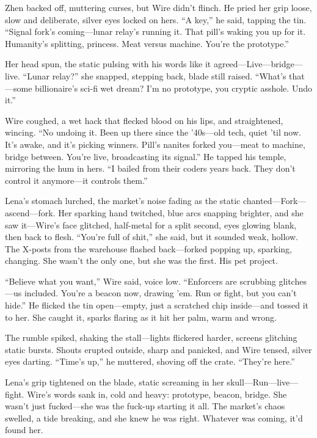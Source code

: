 \documentclass[12pt]{book}
\begin{document}
Zhen backed off, muttering curses, but Wire didn’t flinch. He pried her grip loose, slow and deliberate, silver eyes locked on hers. ``A key,'' he said, tapping the tin. ``Signal fork's coming---lunar relay's running it. That pill's waking you up for it. Humanity's splitting, princess. Meat versus machine. You're the prototype.''

Her head spun, the static pulsing with his words like it agreed---Live---bridge---live. ``Lunar relay?'' she snapped, stepping back, blade still raised. ``What's that---some billionaire's sci-fi wet dream? I'm no prototype, you cryptic asshole. Undo it.''

Wire coughed, a wet hack that flecked blood on his lips, and straightened, wincing. ``No undoing it. Been up there since the '40s---old tech, quiet 'til now. It's awake, and it's picking winners. Pill's nanites forked you---meat to machine, bridge between. You're live, broadcasting its signal.'' He tapped his temple, mirroring the hum in hers. ``I bailed from their coders years back. They don't control it anymore---it controls them.''

Lena's stomach lurched, the market's noise fading as the static chanted---Fork---ascend---fork. Her sparking hand twitched, blue arcs snapping brighter, and she saw it---Wire's face glitched, half-metal for a split second, eyes glowing blank, then back to flesh. ``You're full of shit,'' she said, but it sounded weak, hollow. The X-posts from the warehouse flashed back---forked popping up, sparking, changing. She wasn't the only one, but she was the first. His pet project.

``Believe what you want,'' Wire said, voice low. ``Enforcers are scrubbing glitches---us included. You're a beacon now, drawing 'em. Run or fight, but you can't hide.'' He flicked the tin open---empty, just a scratched chip inside---and tossed it to her. She caught it, sparks flaring as it hit her palm, warm and wrong.

The rumble spiked, shaking the stall---lights flickered harder, screens glitching static bursts. Shouts erupted outside, sharp and panicked, and Wire tensed, silver eyes darting. ``Time's up,'' he muttered, shoving off the crate. ``They're here.''

Lena's grip tightened on the blade, static screaming in her skull---Run---live---fight. Wire's words sank in, cold and heavy: prototype, beacon, bridge. She wasn't just fucked---she was the fuck-up starting it all. The market's chaos swelled, a tide breaking, and she knew he was right. Whatever was coming, it'd found her.
\end{document}
